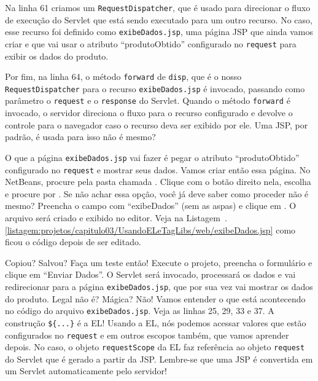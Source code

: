 Na linha 61 criamos um \texttt{RequestDispatcher}, que é usado para direcionar o fluxo de execução do Servlet que está sendo executado para um outro recurso. No caso, esse recurso foi definido como \texttt{exibeDados.jsp}, uma página JSP que ainda vamos criar e que vai usar o atributo ``produtoObtido'' configurado no \texttt{request} para exibir os dados do produto.

Por fim, na linha 64, o método \texttt{forward} de \texttt{disp}, que é o nosso \texttt{RequestDispatcher} para o recurso \texttt{exibeDados.jsp} é invocado, passando como parâmetro o \texttt{request} e o \texttt{response} do Servlet. Quando o método \texttt{forward} é invocado, o servidor direciona o fluxo para o recurso configurado e devolve o controle para o navegador caso o recurso deva ser exibido por ele. Uma JSP, por padrão, é usada para isso não é mesmo?

O que a página \texttt{exibeDados.jsp} vai fazer é pegar o atributo ``produtoObtido'' configurado no \texttt{request} e mostrar seus dados. Vamos criar então essa página. No NetBeans, procure pela pasta chamada . Clique com o botão direito nela, escolha  e procure por . Se não achar essa opção, você já deve saber como proceder não é mesmo? Preencha o campo  com ``exibeDados'' (sem as aspas) e clique em . O arquivo será criado e exibido no editor. Veja na Listagem~\thechapter.\ref{listagem:projetos/capitulo03/UsandoELeTagLibs/web/exibeDados.jsp} como ficou o código depois de ser editado.


Copiou? Salvou? Faça um teste então! Execute o projeto, preencha o formulário e clique em ``Enviar Dados''. O Servlet será invocado, processará os dados e vai redirecionar para a página \texttt{exibeDados.jsp}, que por sua vez vai mostrar os dados do produto. Legal não é? Mágica? Não! Vamos entender o que está acontecendo no código do arquivo \texttt{exibeDados.jsp}. Veja as linhas 25, 29, 33 e 37. A construção \texttt{\$\{...\}} é a EL! Usando a EL, nós podemos acessar valores que estão configurados no \texttt{request} e em outros escopos também, que vamos aprender depois. No caso, o objeto \texttt{requestScope} da EL faz referência ao objeto \texttt{request} do Servlet que é gerado a partir da JSP. Lembre-se que uma JSP é convertida em um Servlet automaticamente pelo servidor!

